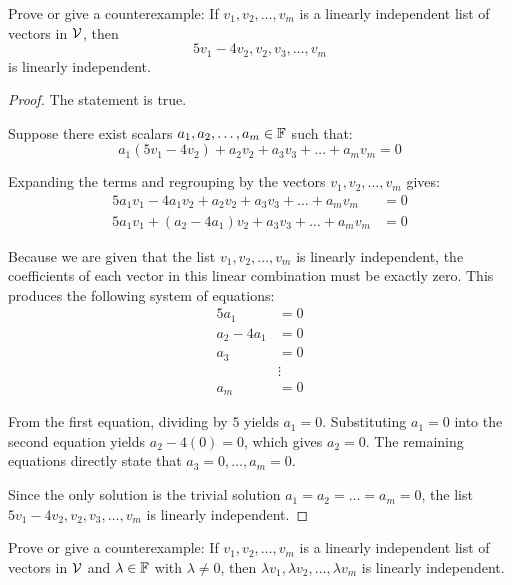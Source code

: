 \begin{question}
	Prove or give a counterexample: If $v_1, v_2, \dots, v_m$ is a linearly independent list of vectors in $\mathcal{V}$, then
	\[
	5v_1 - 4v_2, v_2, v_3, \dots, v_m
	\]
	is linearly independent.
\end{question}
\begin{proof}
	The statement is true.
	
	Suppose there exist scalars $a_1, a_2, \dots, a_m \in \mathbb{F}$ such that:
	\[
	a_1(5v_1 - 4v_2) + a_2v_2 + a_3v_3 + \dots + a_mv_m = 0
	\]
	
	Expanding the terms and regrouping by the vectors $v_1, v_2, \dots, v_m$ gives:
	\begin{align*}
		5a_1v_1 - 4a_1v_2 + a_2v_2 + a_3v_3 + \dots + a_mv_m &= 0 \\
		5a_1v_1 + (a_2 - 4a_1)v_2 + a_3v_3 + \dots + a_mv_m &= 0
	\end{align*}
	
	Because we are given that the list $v_1, v_2, \dots, v_m$ is linearly independent, the coefficients of each vector in this linear combination must be exactly zero. This produces the following system of equations:
	\begin{align*}
		5a_1 &= 0 \\
		a_2 - 4a_1 &= 0 \\
		a_3 &= 0 \\
		&\vdots \\
		a_m &= 0
	\end{align*}
	
	From the first equation, dividing by $5$ yields $a_1 = 0$. 
	Substituting $a_1 = 0$ into the second equation yields $a_2 - 4(0) = 0$, which gives $a_2 = 0$. 
	The remaining equations directly state that $a_3 = 0, \dots, a_m = 0$.
	
	Since the only solution is the trivial solution $a_1 = a_2 = \dots = a_m = 0$, the list $5v_1 - 4v_2, v_2, v_3, \dots, v_m$ is linearly independent.
\end{proof}
\begin{question}
	Prove or give a counterexample: If $v_1, v_2, \dots, v_m$ is a linearly independent list of vectors in $\mathcal{V}$ and $\lambda \in \mathbb{F}$ with $\lambda \neq 0$, then $\lambda v_1, \lambda v_2, \dots, \lambda v_m$ is linearly independent.
\end{question}
